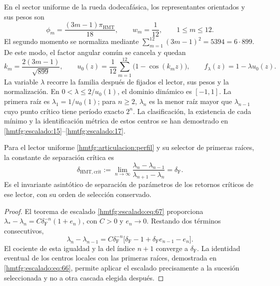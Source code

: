 En el sector uniforme de la rueda dodecafásica, los representantes
orientados y sus pesos son
\[
 \phi_m=\frac{(3m-1)\pi_{\mathrm{HMT}}}{18},\qquad
 w_m=\frac1{12},\qquad 1\le m\le12.
\]
El segundo momento se normaliza mediante
\(\sum_{m=1}^{12}(3m-1)^2=5394=6\cdot899\).
De este modo, el factor angular común se cancela y quedan
\begin{equation}
 k_m=\frac{2(3m-1)}{\sqrt{899}},\qquad
 u_0(z)=\frac1{12}\sum_{m=1}^{12}\bigl(1-\cos(k_mz)\bigr),
 \qquad f_\lambda(z)=1-\lambda u_0(z).
 \label{hmtfg:articulacion:perfil}
\end{equation}
La variable \(\lambda\) recorre la familia después de fijados el
lector, sus pesos y la normalización. En
\(0<\lambda\le2/u_0(1)\), el dominio dinámico es \([-1,1]\).
La primera raíz es \(\lambda_1=1/u_0(1)\); para \(n\ge2\),
\(\lambda_n\) es la menor raíz mayor que \(\lambda_{n-1}\)
cuyo punto crítico tiene período exacto \(2^n\).
La clasificación, la existencia de cada mínimo y la identificación
métrica de estos centros se han demostrado en
\ref{hmtfg:escalado:15}--\ref{hmtfg:escalado:17}.

\begin{proposition}
\label{hmtfg:articulacion:delta}
Para el lector uniforme \eqref{hmtfg:articulacion:perfil} y su selector
de primeras raíces, la constante de separación crítica es
\begin{equation}
 \delta_{\mathrm{HMT,crit}}
 :=\lim_{n\to\infty}
 \frac{\lambda_n-\lambda_{n-1}}{\lambda_{n+1}-\lambda_n}
 =\delta_{\mathrm F}.
 \label{hmtfg:articulacion:limite}
\end{equation}
Es el invariante asintótico de separación de parámetros de los retornos
críticos de ese lector, con su orden de selección conservado.
\end{proposition}
\begin{proof}
El teorema de escalado \eqref{hmtfg:escalado:eq:67} proporciona
\(\lambda_*-\lambda_n=C\delta_{\mathrm F}^{-n}(1+e_n)\),
con \(C>0\) y \(e_n\to0\). Restando dos términos consecutivos,
\[
 \lambda_n-\lambda_{n-1}
 =C\delta_{\mathrm F}^{-n}
   \bigl[\delta_{\mathrm F}-1+
          \delta_{\mathrm F}e_{n-1}-e_n\bigr].
\]
El cociente de esta igualdad y la del índice \(n+1\) converge a
\(\delta_{\mathrm F}\). La identidad eventual de los centros locales
con las primeras raíces, demostrada en
\eqref{hmtfg:escalado:eq:66}, permite aplicar el escalado precisamente
a la sucesión seleccionada y no a otra cascada elegida después.
\end{proof}

